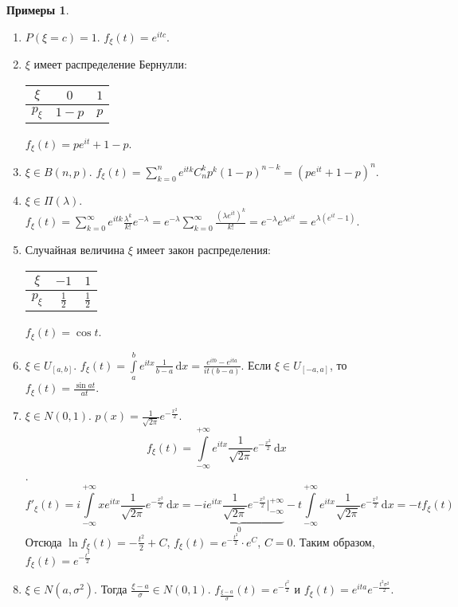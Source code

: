 \documentclass[11pt,openany,a4paper]{scrartcl}
\theoremstyle{plain}
\theoremstyle{definition}
\newtheorem{examples}[theorem]{Примеры}
\newcommand{\dif}{\, \mathrm d}
\begin{document}
\begin{examples}
\mbox{}
    \begin{enumerate}
        \item $P(\xi = c) = 1$. $f_\xi(t) = e^{itc}$.
        \item $\xi$ имеет распределение Бернулли:
        \begin{center}
            \begin{tabular}{| c | c | c |}
                \hline
                $\xi$ & $0$ & $1$ \\ \hline
                $p_\xi$ & $1-p$ & $p$ \\ \hline
            \end{tabular}
        \end{center}
        $f_\xi(t) = pe^{it} + 1 - p$.
        \item $\xi \in B(n, p)$.
        $f_\xi(t) = \sum\limits_{k=0}^n e^{itk}C_n^kp^k(1-p)^{n-k} =
        (pe^{it} + 1 - p)^n$.
        \item $\xi \in \Pi(\lambda)$.
        $f_\xi(t) = \sum\limits_{k=0}^\infty
        e^{itk} \frac{\lambda^k}{k!}e^{-\lambda} =
        e^{-\lambda}\sum\limits_{k=0}^\infty\frac{(\lambda e^{it})^k}{k!} =
        e^{-\lambda}e^{\lambda e^{it}} = e^{\lambda(e^{it} - 1)}$.
        \item Случайная величина $\xi$ имеет закон распределения:
        \begin{center}
            \begin{tabular}{| c | c | c |}
                \hline
                $\xi$ & $-1$ & $1$ \\ \hline
                $p_\xi$ & $\frac{1}{2}$ & $\frac{1}{2}$ \\ \hline
            \end{tabular}
        \end{center}
        $f_\xi(t) = \cos t$.
        \item $\xi \in U_{[a, b]}$. $f_\xi(t) =
        \int\limits_a^b e^{itx} \frac{1}{b-a}\dif x =
        \frac{e^{itb} - e^{ita}}{it(b-a)}$.
        Если $\xi \in U_{[-a, a]}$, то $f_\xi(t) = \frac{\sin at}{at}$.
        \item $\xi \in N(0, 1)$. $p(x) = \frac{1}{\sqrt{2\pi}}e^{-\frac{x^2}{2}}$.
        $$
        f_\xi(t) = \int\limits_{-\infty}^{+\infty}
        e^{itx}\frac{1}{\sqrt{2\pi}}e^{-\frac{x^2}{2}} \dif x
        $$.
        $$
        f'_\xi(t) = i\int\limits_{-\infty}^{+\infty}
        xe^{itx}\frac{1}{\sqrt{2\pi}}e^{-\frac{x^2}{2}} \dif x =
        \underbrace{-ie^{itx}\frac{1}{\sqrt{2\pi}}e^{-\frac{x^2}{2}}
        \bigg|_{-\infty}^{+\infty}}_{0} -
        t\int\limits_{-\infty}^{+\infty}
        e^{itx}\frac{1}{\sqrt{2\pi}}e^{-\frac{x^2}{2}} \dif x = -tf_\xi(t)
        $$
        Отсюда $\ln f_\xi(t) = -\frac{t^2}{2} + C$, $f_\xi(t) = e^{-\frac{t^2}{2}}
        \cdot e^C$, $C = 0$. Таким образом, $f_\xi(t) = e^{-\frac{t^2}{2}}$
        \item $\xi \in N(a, \sigma^2)$.
        Тогда $\frac{\xi - a}{\sigma} \in N(0, 1)$.
        $f_{\frac{\xi - a}{\sigma}}(t) = e^{-\frac{t^2}{2}}$ и $f_\xi(t) =
        e^{ita}e^{-\frac{t^2\sigma^2}{2}}$.
    \end{enumerate}
\end{examples}
\end{document}
